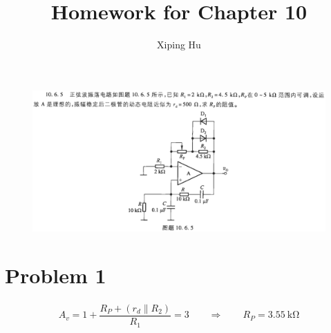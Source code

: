 \documentclass{article}
\author{Xiping Hu}
\affil{https://hxp.plus/}
\title{Homework for Chapter 10}
\newcommand{\si}[1]{\  \mathrm{#1}}
\begin{document}
\maketitle

\begin{figure}[H]
  \centering
  \includegraphics[width=\linewidth]{figures/Problem1065}
\end{figure}

\section{Problem 1}

\begin{equation*}
  \begin{aligned}
    A_v = 1 + \dfrac{R_P + \left( r_d \parallel R_2 \right)}{R_1} = 3 \quad\quad \Rightarrow  \quad\quad R_P = 3.55 \si{k \Omega}
  \end{aligned}
\end{equation*}
\end{document}
